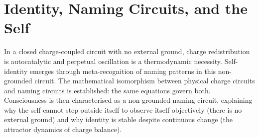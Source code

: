 \chapter{Identity, Naming Circuits, and the Self}
\label{ch:identity}


\begin{chapterabstract}
In a closed charge-coupled circuit with no external ground, charge redistribution is autocatalytic and perpetual oscillation is a thermodynamic necessity. Self-identity emerges through meta-recognition of naming patterns in this non-grounded circuit. The mathematical isomorphism between physical charge circuits and naming circuits is established: the same equations govern both. Consciousness is then characterised as a non-grounded naming circuit, explaining why the self cannot step outside itself to observe itself objectively (there is no external ground) and why identity is stable despite continuous change (the attractor dynamics of charge balance).
\end{chapterabstract}


